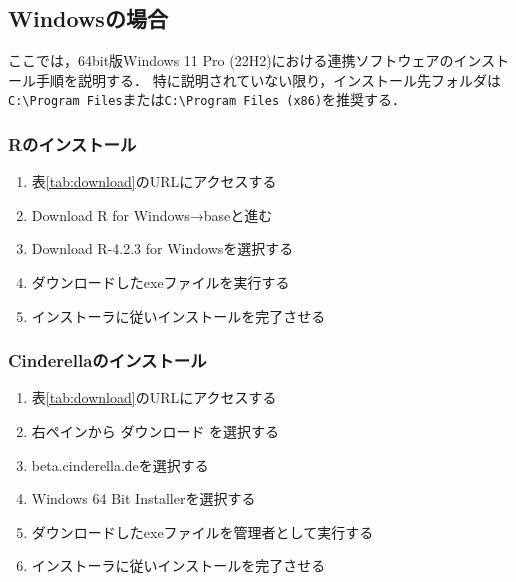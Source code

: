 \subsection{Windowsの場合}

ここでは，64bit版Windows 11 Pro (22H2)における連携ソフトウェアのインストール手順を説明する．
特に説明されていない限り，インストール先フォルダは\verb|C:\Program Files|または\verb|C:\Program Files (x86)|を推奨する．

\subsubsection{Rのインストール}
\begin{enumerate}
    \item 表\ref{tab:download}のURLにアクセスする
    \item Download R for Windows→baseと進む
    \item Download R-4.2.3 for Windowsを選択する
    \item ダウンロードしたexeファイルを実行する
    \item インストーラに従いインストールを完了させる
\end{enumerate}

\subsubsection{Cinderellaのインストール}
\begin{enumerate}
    \item 表\ref{tab:download}のURLにアクセスする
    \item 右ペインから ダウンロード を選択する
    \item beta.cinderella.deを選択する
    \item Windows 64 Bit Installerを選択する
    \item ダウンロードしたexeファイルを管理者として実行する
    \item インストーラに従いインストールを完了させる
\end{enumerate}

\newpage

